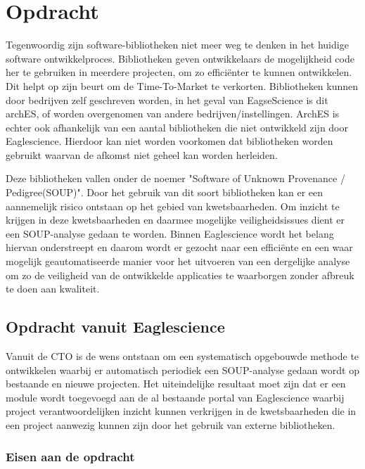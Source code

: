 
\chapter{Opdracht}\label{ch:opdracht} %
Tegenwoordig zijn software-bibliotheken niet meer weg te denken in het huidige software ontwikkelproces.
Bibliotheken geven ontwikkelaars de mogelijkheid code her te gebruiken in meerdere projecten, om zo efficiënter te kunnen ontwikkelen.
Dit helpt op zijn beurt om de Time-To-Market te verkorten.
Bibliotheken kunnen door bedrijven zelf geschreven worden, in het geval van EagseScience is dit archES, of worden overgenomen van andere bedrijven/instellingen.
ArchES is echter ook afhankelijk van een aantal bibliotheken die niet ontwikkeld zijn door Eaglescience.
Hierdoor kan niet worden voorkomen dat bibliotheken worden gebruikt waarvan de afkomst niet geheel kan worden herleiden.

Deze bibliotheken vallen onder de noemer "Software of Unknown Provenance / Pedigree(SOUP)".
Door het gebruik van dit soort bibliotheken kan er een aannemelijk risico ontstaan op het gebied van kwetsbaarheden.
Om inzicht te krijgen in deze kwetsbaarheden en daarmee mogelijke veiligheidsissues dient er een SOUP-analyse gedaan te worden.
Binnen Eaglescience wordt het belang hiervan onderstreept en daarom wordt er gezocht naar een efficiënte en een waar mogelijk geautomatiseerde manier voor het uitvoeren van een dergelijke analyse om zo de veiligheid van de ontwikkelde applicaties te waarborgen zonder afbreuk te doen aan kwaliteit.

\section{Opdracht vanuit Eaglescience}\label{sec:opdracht-vanuit-eaglescience}
Vanuit de CTO is de wens ontstaan om een systematisch opgebouwde methode te ontwikkelen waarbij er automatisch periodiek een SOUP-analyse gedaan wordt op bestaande en nieuwe projecten.
Het uiteindelijke resultaat moet zijn dat er een module wordt toegevoegd aan de al bestaande portal van Eaglescience waarbij project verantwoordelijken inzicht kunnen verkrijgen in de kwetsbaarheden die in een project aanwezig kunnen zijn door het gebruik van externe bibliotheken.

\subsection{Eisen aan de opdracht}\label{subsec: eisen-aan-de-opdracht}

